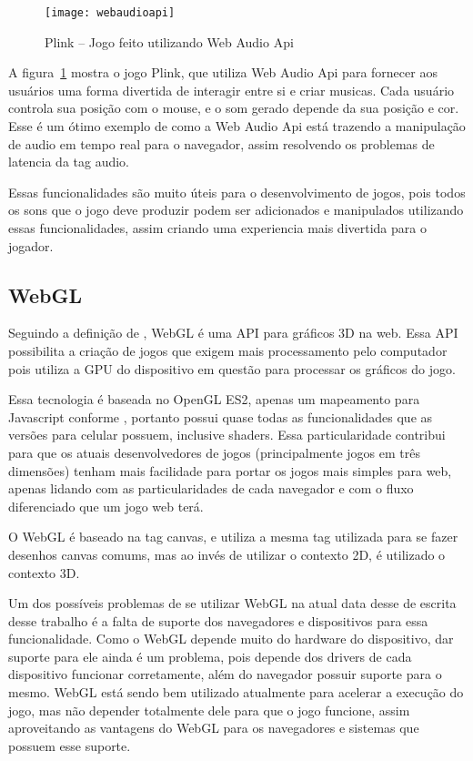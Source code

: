 \begin{figure}[H]
  \centering
	\texttt{[image: webaudioapi]}
  \caption{Plink {--} Jogo feito utilizando Web Audio Api}
  \label{img:webaudioapi}
\end{figure}

A figura~\ref{img:webaudioapi} mostra o jogo Plink, que utiliza Web
Audio Api para fornecer aos usuários uma forma divertida de interagir
entre si e criar musicas. Cada usuário controla sua posição com o
mouse, e o som gerado depende da sua posição e cor. Esse é um ótimo
exemplo de como a Web Audio Api está trazendo a manipulação de audio
em tempo real para o navegador, assim resolvendo os problemas de
latencia da tag audio.

Essas funcionalidades são muito úteis para o desenvolvimento de jogos, pois
todos os sons que o jogo deve produzir podem ser adicionados e
manipulados utilizando essas funcionalidades, assim criando uma
experiencia mais divertida para o jogador.

\subsection{WebGL}

Seguindo a definição de \cite{lubbers2010pro}, WebGL é uma API para gráficos 3D na web. Essa
API possibilita a criação de jogos que exigem mais processamento pelo
computador pois utiliza a GPU do dispositivo em questão para processar
os gráficos do jogo.

Essa tecnologia é baseada no OpenGL ES2, apenas um mapeamento para
Javascript conforme , portanto possui
quase todas as funcionalidades que as versões para celular possuem,
inclusive shaders. Essa particularidade contribui
para que os atuais desenvolvedores de jogos (principalmente jogos em
três dimensões) tenham mais facilidade para portar os jogos mais
simples para web, apenas lidando com as particularidades de cada
navegador e com o fluxo diferenciado que um jogo web terá.

O WebGL é baseado na tag canvas, e utiliza a mesma tag utilizada para
se fazer desenhos canvas comums, mas ao invés de utilizar o contexto
2D, é utilizado o contexto 3D.

Um dos possíveis problemas de se utilizar WebGL na atual data desse
de escrita desse trabalho é a falta de suporte dos navegadores e
dispositivos para essa funcionalidade. Como o WebGL depende muito do
hardware do dispositivo, dar suporte para ele ainda é um problema,
pois depende dos drivers de cada dispositivo funcionar
corretamente, além do navegador possuir suporte para o mesmo.
WebGL está sendo bem utilizado atualmente para acelerar a execução do jogo,
mas não depender totalmente dele para que o jogo funcione, assim
aproveitando as vantagens do WebGL para os navegadores e sistemas que
possuem esse suporte.

